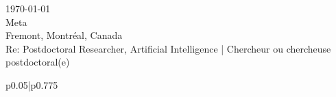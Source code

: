 \documentclass[12pt]{article} %
\begin{document}
\begin{paracol}{2} %


\parbox[top][0.1\textheight][c]{\linewidth}{ %
	\vspace{0.0\textheight} %
	\today\\[6pt]
	Meta\\
	Fremont, Montr\'{e}al, Canada\\
	Re: Postdoctoral Researcher, Artificial Intelligence | Chercheur ou chercheuse postdoctoral(e)\\[6pt] \medskip
}


\switchcolumn %


\parbox[top][0.1\textheight][c]{\linewidth}{ %
	\vspace{0\textheight} %
	\colorbox{shade}{ %
		\begin{supertabular}{p{0.05\linewidth}|p{0.775\linewidth}} %
			\ifthenelse{\equal{\cvdate}{}}{}{\raisebox{-1pt}{\faInfo} & \cvdate \\}
			\ifthenelse{\equal{\cvaddress}{}}{}{\raisebox{-1pt}{\faHome} & \cvaddress \\} %
			\ifthenelse{\equal{\cvaddress}{}}{}{\raisebox{-1pt}{\faPhone} & \cvnumberphone \\} %
		\end{supertabular}
	}
}


\end{paracol}
\end{document}
